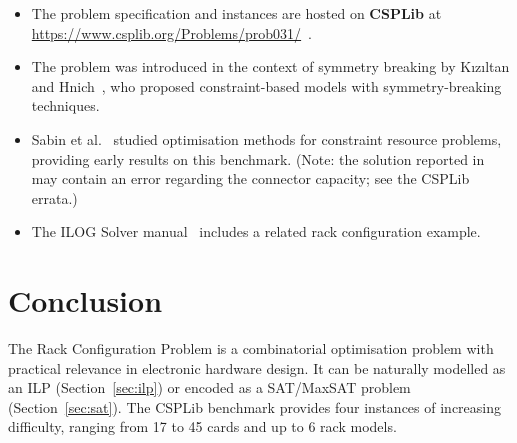 \documentclass[11pt,a4paper]{article}
\begin{document}
\begin{itemize}
  \item The problem specification and instances are hosted on
        \textbf{CSPLib} at
        \url{https://www.csplib.org/Problems/prob031/}~\cite{csplib}.
  \item The problem was introduced in the context of symmetry breaking
        by Kızıltan and Hnich~\cite{Kiziltan01symmetrybreaking},
        who proposed constraint-based models with symmetry-breaking
        techniques.
  \item Sabin et al.~\cite{sabin1999optimization} studied
        optimisation methods for constraint resource problems,
        providing early results on this benchmark.
        (Note: the solution reported in~\cite{sabin1999optimization}
        may contain an error regarding the connector capacity;
        see the CSPLib errata.)
  \item The ILOG Solver manual~\cite{Ilog:Solver02} includes
        a related rack configuration example.
\end{itemize}

\section{Conclusion}
\label{sec:conclusion}

The Rack Configuration Problem is a combinatorial optimisation problem
with practical relevance in electronic hardware design.
It can be naturally modelled as an ILP (Section~\ref{sec:ilp})
or encoded as a SAT/MaxSAT problem (Section~\ref{sec:sat}).
The CSPLib benchmark provides four instances of increasing difficulty,
ranging from 17 to 45 cards and up to 6 rack models.



\end{document}
